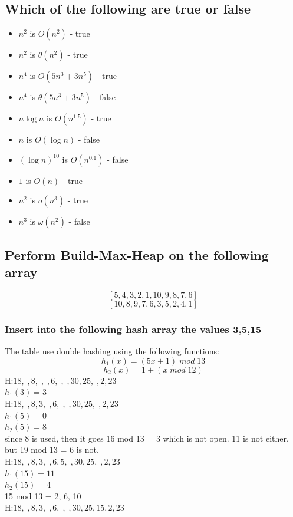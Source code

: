 \documentclass[12pt, a4paper]{article}
\begin{document}
		\subsection{Which of the following are true or false}
			\begin{itemize}
				\item $n^2$ is $O(n^2)$ - true
				\item $n^2$ is $\theta(n^2)$ - true
				\item $n^4$ is $O(5n^3+3n^5)$ - true
				\item $n^4$ is $\theta(5n^3+3n^5)$ - false
				\item $n\log n$ is $O(n^{1.5})$ - true
				\item $n$ is $O(\log n)$ - false
				\item $(\log n)^{10}$ is $O(n^{0.1})$ - false
				\item $1$ is $O(n)$ - true
				\item $n^2$ is $o(n^3)$ - true
				\item $n^3$ is $\omega(n^2)$ - false
			\end{itemize}
		\subsection{Perform Build-Max-Heap on the following array}
			$$[5,4,3,2,1,10,9,8,7,6]$$
			$$[10, 8, 9, 7, 6, 3, 5, 2, 4, 1]$$
		\subsubsection{Insert into the following hash array the values 3,5,15}
			The table use double hashing using the following functions:
				$$h_1(x)=(5x+1)\; mod\; 13$$
				$$h_2(x)=1+(x\; mod\;12)$$
			H:$18,\;,8,\;,\;,6,\;,\;,30,25,\;,2,23$\\
			$h_1(3)=3$\\
			H:$18,\;,8,3,\;,6,\;,\;,30,25,\;,2,23$\\
			$h_1(5)=0$\\
			$h_2(5)=8$\\
			since 8 is used, then it goes 16 mod 13 = 3 which is not open. 11 is not either, but 19 mod 13 = 6 is not.\\
			H:$18,\;,8,3,\;,6,5,\;,30,25,\;,2,23$\\
			$h_1(15)=11$\\
			$h_2(15)=4$\\
			15 mod 13 = 2, 6, 10\\
			H:$18,\;,8,3,\;,6,\;,\;,30,25,15,2,23$\\
\end{document}
